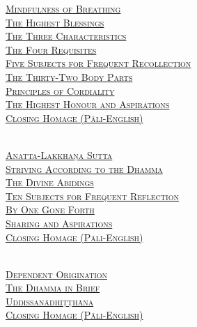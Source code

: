 \begin{center}
  \textsc{
    \hyperref[mindfulness-of-breathing]{Mindfulness of Breathing} \pageref{mindfulness-of-breathing}\\
    \hyperref[highest-blessings]{The Highest Blessings} \pageref{highest-blessings}\\
    \hyperref[three-characteristics]{The Three Characteristics} \pageref{three-characteristics}\\
    \hyperref[four-requisites]{The Four Requisites} \pageref{four-requisites}\\
    \hyperref[five-recollections]{Five Subjects for Frequent Recollection} \pageref{five-recollections}\\
    \hyperref[32-parts]{The Thirty-Two Body Parts} \pageref{32-parts}\\
    \hyperref[principles-of-cordiality]{Principles of Cordiality} \pageref{principles-of-cordiality}\\
    \hyperref[highest-honour-aspirations]{The Highest Honour and Aspirations} \pageref{highest-honour-aspirations}\\
    \hyperref[closing-homage]{Closing Homage (Pāli-English)}} \pageref{closing-homage}\\

  \bigskip

  {\libertinusFont\selectfont\textbf{\textsc{}}}\\

  \textsc{
    \hyperref[anatta-lakkhana]{Anatta-Lakkhaṇa Sutta} \pageref{anatta-lakkhana}\\
    \hyperref[striving-according-to-dhamma]{Striving According to the Dhamma} \pageref{striving-according-to-dhamma}\\
    \hyperref[divine-abidings]{The Divine Abidings} \pageref{divine-abidings}\\
    \hyperref[ten-recollections]{Ten Subjects for Frequent Reflection\\ By One Gone Forth} \pageref{ten-recollections}\\
    \hyperref[sharing-aspirations]{Sharing and Aspirations} \pageref{sharing-aspirations}\\
    \hyperref[closing-homage]{Closing Homage (Pāli-English)}} \pageref{closing-homage}\\

  \bigskip
  \clearpage

  {\libertinusFont\selectfont\textbf{\textsc{}}}\\

  \textsc{
    \hyperref[dependent-origination]{Dependent Origination} \pageref{dependent-origination}\\
    \hyperref[dhamma-in-brief]{The Dhamma in Brief} \pageref{dhamma-in-brief}\\
    \hyperref[uddissanadhitthana]{Uddissanādhiṭṭhāna} \pageref{uddissanadhitthana}\\
    \hyperref[closing-homage]{Closing Homage (Pāli-English)}} \pageref{closing-homage}\\


\end{center}
